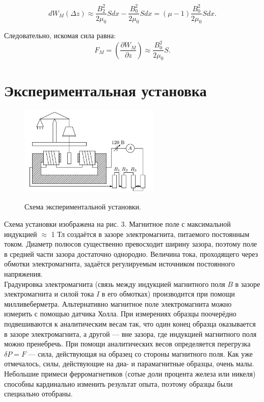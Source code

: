 \documentclass[12pt,a4paper]{article}
\begin{document}
\[
dW_M(\Delta z) \approx \frac{B_2^2}{2 \mu_0} S dx - \frac{B_0^2}{2 \mu_0} S dx = ( \mu - 1 ) \frac{B_0^2}{2 \mu_0} S dx.
\]

Следовательно, искомая сила равна:
\[
F_M = \left( \frac{\partial W_M}{\partial z} \right) \approx \frac{B_0^2}{2 \mu_0} S. \tag{3}
\]




\section{Экспериментальная установка}
\begin{figure}[h!]
	\begin{center}
		\includegraphics[width = 0.6\textwidth]{ust.png}
		\label{fig:facility}
        \caption{Схема экспериментальной установки.}
	\end{center}
\end{figure}
Схема установки изображена на рис. 3. Магнитное поле с максимальной индукцией $\approx$ 1 Тл создаётся в зазоре электромагнита, питаемого
постоянным током. Диаметр полюсов существенно превосходит ширину зазора, поэтому поле в средней части зазора достаточно однородно.
Величина тока, проходящего через обмотки электромагнита, задаётся
регулируемым источником постоянного напряжения.\\
Градуировка электромагнита (связь между индукцией магнитного
поля $B$ в зазоре электромагнита и силой тока $I$ в его обмотках) производится при помощи милливеберметра. Альтернативно магнитное
поле электромагнита можно измерить с помощью датчика Холла.
При измерениях образцы поочерёдно подвешиваются к аналитическим весам так, что один конец образца оказывается в зазоре электромагнита, а другой — вне зазора, где индукцией магнитного поля можно
пренебречь. При помощи аналитических весов определяется перегрузка $\delta P = F$ — сила, действующая на образец со стороны магнитного
поля.
Как уже отмечалось, силы, действующие на диа- и парамагнитные
образцы, очень малы. Небольшие примеси ферромагнетиков (сотые доли
процента железа или никеля) способны кардинально изменить результат
опыта, поэтому образцы были специально отобраны.
\end{document}
